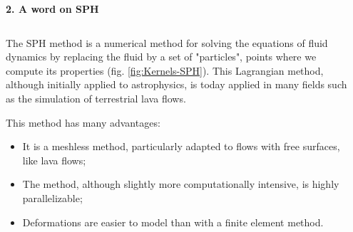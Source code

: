 \documentclass[final,t]{beamer}
\let\olditem\item
\renewcommand\item{\olditem\justifying}
\begin{document}
\begin{frame}
\begin{columns}[t]
\begin{column}{.495\linewidth}
  \vspace{0.79cm}
  
  \begin{block}{\textbf{2. A word on SPH}}
  \begin{columns}
  \begin{column}{0.69\textwidth}\rightskip=0pt\leftskip=0pt
    The SPH method \cite{GingoldMonaghan} is a numerical method for solving the equations of fluid dynamics by replacing the fluid by a set of "particles", points where we compute its properties (fig. \ref{fig:Kernels-SPH}). This Lagrangian method, although initially applied to astrophysics, is today applied in many fields such as the simulation of terrestrial lava flows.
    
This method has many advantages:
\begin{itemize}
	\item It is a meshless method, particularly adapted to flows with free surfaces, like lava flows;
	\item The method, although slightly more computationally intensive, is highly parallelizable;
	\item Deformations are easier to model than with a finite element method.
\end{itemize}

  \end{column}
  \begin{column}{0.29\textwidth}\rightskip=0pt\leftskip=0pt
  

\end{column}
\end{columns}
\end{block}
\end{column}
\end{columns}
\end{frame}
\end{document}
